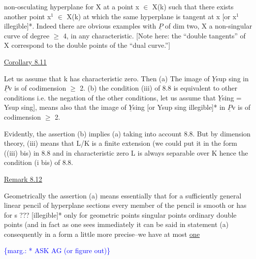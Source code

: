 \documentclass[11pt]{article}
\newcommand{\scanpage}[1]{\par\bigskip\noindent{\small\sffamily[scan #1]}\par}
\newcommand{\mspage}[1]{{\small\sffamily[p.\,#1]}}
\newcommand{\margin}[1]{\textcolor{blue}{\{\textsf{marg.:} #1\}}}
\newcommand{\uline}[1]{\underline{#1}}
\begin{document}
non-osculating hyperplane for X at a point x $\in$ X(k) such that
there exists another point x$^{1}$ $\in$ X(k) at which the same hyperplane
is tangent at x [or x$^{1}$ illegible]*. Indeed there are obvious
examples with $\underline{P}$ of dim two, X a non-singular curve of degree $\geq$ 4,
in any characteristic. [Note here: the ``double tangents'' of X
correspond to the double points of the ``dual curve.'']

\uline{Corollary 8.11}

Let us assume that k has characteristic zero. Then (a) The
image of $\underline{Y}$sup sing in $\underline{P}$v is of codimension $\geq$ 2. (b) the condition
(iii) of 8.8 is equivalent to other conditions i.e. the negation
of the other conditions, let us assume that $\underline{Y}$sing = Ysup sing], means
also that the image of $\underline{Y}$sing [or Ysup sing illegible]* in $\underline{P}$v is of
codimension $\geq$ 2.

Evidently, the assertion (b) implies (a) taking into account
8.8. But by dimension theory, (iii) means that L/K is a finite
extension (we could put it in the form ((iii) bis) in 8.8 and in
characteristic zero L is always separable over K hence the
condition (i bis) of 8.8.

\uline{Remark 8.12}

Geometrically the assertion (a) means essentially that for a
sufficiently general linear pencil of hyperplane sections every
member of the pencil is smooth or has for s ??? [illegible]* only
for geometric points singular points ordinary double points (and
in fact as one sees immediately it can be said in statement (a)
consequently in a form a little more precise--we have at most \uline{one}

\margin{* ASK AG (or figure out)}

\clearpage
\scanpage{24/53}
\mspage{53}
\end{document}

